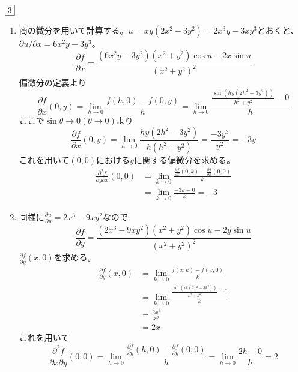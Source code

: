\documentclass[dvipdfmx]{jsreport}
\newcounter{num}[section]
\begin{document}
\begin{answer} %
	$\fbox{3}$
\begin{enumerate}
	\item 商の微分を用いて計算する。$u= xy(2x^2- 3y^2)= 2x^3y- 3xy^3$とおくと、$\partial u/\partial x= 6x^2y- 3y^3$。
\begin{equation*}
	\frac{\partial f}{\partial x}= \frac{(6x^2y- 3y^2)(x^2+ y^2)\cos{u}- 2x\sin{u}}{(x^2+ y^2)^2}
\end{equation*}
	偏微分の定義より
\begin{equation*}
	\frac{\partial f}{\partial x}(0, y)= \lim_{h\to 0} \frac{f(h, 0)- f(0, y)}{h}= \lim_{h\to 0} \frac{\frac{\sin{(hy(2h^2- 3y^2))}}{h^2+ y^2}- 0}{h}
\end{equation*}
	ここで$\sin{\theta}\to 0(\theta\to 0)$より
\begin{equation*}
	\frac{\partial f}{\partial x}(0, y)= \lim_{h\to 0} \frac{hy(2h^2- 3y^2)}{h(h^2+ y^2)}= \frac{-3y^3}{y^2}= -3y
\end{equation*}
	これを用いて$(0, 0)$における$y$に関する偏微分を求める。
\begin{align*}
	\frac{\partial^2 f}{\partial y\partial x}(0, 0)
	&= \lim_{k\to 0} \frac{\frac{\partial f}{\partial x}(0, k)- \frac{\partial f}{\partial x}(0, 0)}{k}\\
	&=\lim_{k\to 0} \frac{-3k- 0}{k}= -3
\end{align*}

	\item 同様に$\frac{\partial u}{\partial y}= 2x^3-9xy^2$なので
\begin{equation*}
	\frac{\partial f}{\partial y}= \frac{(2x^3- 9xy^2)(x^2+ y^2)\cos{u}- 2y\sin{u}}{(x^2+ y^2)^2}
\end{equation*}
	$\frac{\partial f}{\partial y}(x, 0)$を求める。
\begin{align*}
	\frac{\partial f}{\partial y}(x, 0)
	&= \lim_{k\to 0} \frac{f(x, k)- f(x, 0)}{k}\\
	&= \lim_{k\to 0} \frac{\frac{\sin(xk(2x^2- 3k^2))}{x^2+ k^2}- 0}{k}\\
	&= \frac{2x^3}{x^2}\\
	&= 2x
\end{align*}
	これを用いて
\begin{equation*}
	\frac{\partial^2 f}{\partial x\partial y}(0, 0)= \lim_{h\to 0} \frac{\frac{\partial f}{\partial y}(h, 0)- \frac{\partial f}{\partial y}(0, 0)}{h}= \lim_{h\to 0} \frac{2h- 0}{h}= 2
\end{equation*}


\end{enumerate}
\end{answer}
\end{document}
